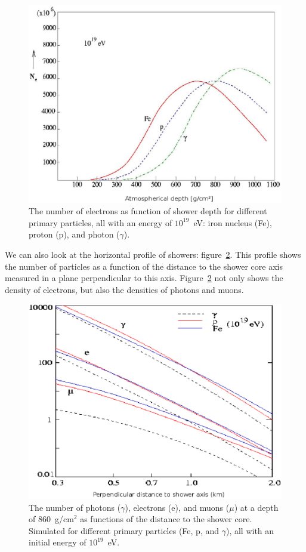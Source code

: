 \documentclass[12pt,a4paper]{article}
\numberwithin{equation}{section}
\numberwithin{figure}{section}
\numberwithin{table}{section}
\begin{document}
\begin{figure}\begin{center}
\includegraphics[scale=0.5]{profile2.eps}%
\caption{The number of electrons as function of shower depth for different primary particles, all with an energy of $10^{19}$~eV: iron nucleus (Fe), proton (p), and photon ($\gamma$).}\label{fig:profile2}
\end{center}\end{figure}

We can also look at the horizontal profile of showers: figure~\ref{fig:profile3}. This profile shows the number of particles as a function of the distance to the shower core axis measured in a plane perpendicular to this axis. Figure~\ref{fig:profile3} not only shows the density of electrons, but also the densities of photons and muons. 

\begin{figure}\begin{center}
\includegraphics[scale=0.5]{profile3.eps}%
\caption{The number of photons ($\gamma$), electrons (e), and muons ($\mu$) at a depth of 860~g/cm$^2$ as functions of the distance to the shower core. Simulated for different primary particles (Fe, p, and $\gamma$), all with an initial energy of $10^{19}$~eV. }\label{fig:profile3}
\end{center}\end{figure}
\end{document}
